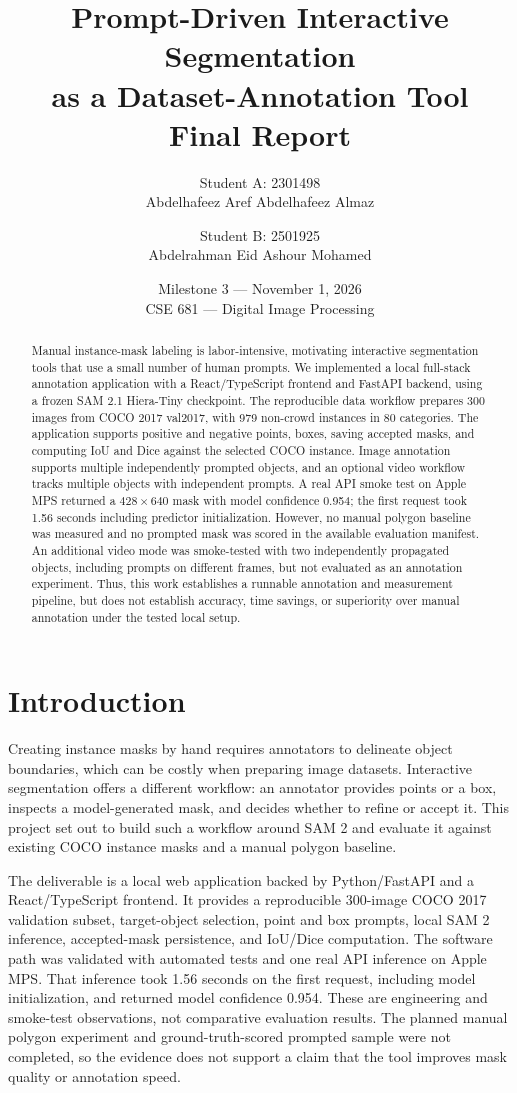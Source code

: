 \documentclass[11pt]{article}
\title{\LARGE Prompt-Driven Interactive Segmentation\\
\large as a Dataset-Annotation Tool\\[4pt]
\large Final Report}
\author{
  \begin{tabular}{c}
    Student A: 2301498\\
    Abdelhafeez Aref Abdelhafeez Almaz
  \end{tabular}
  \and
  \begin{tabular}{c}
    Student B: 2501925\\
    Abdelrahman Eid Ashour Mohamed
  \end{tabular}
}
\date{Milestone 3 --- November 1, 2026\\CSE 681 --- Digital Image Processing}
\begin{document}
\maketitle

\begin{abstract}
Manual instance-mask labeling is labor-intensive, motivating interactive
segmentation tools that use a small number of human prompts. We implemented a
local full-stack annotation application with a React/TypeScript frontend and
FastAPI backend, using a frozen SAM 2.1 Hiera-Tiny checkpoint. The reproducible
data workflow prepares 300 images from COCO 2017 val2017, with 979 non-crowd
instances in 80 categories. The application supports positive and negative
points, boxes, saving accepted masks, and computing IoU and Dice against the
selected COCO instance. Image annotation supports multiple independently
prompted objects, and an optional video workflow tracks multiple objects with
independent prompts. A real API smoke test on Apple MPS returned a
$428\times640$ mask with model confidence 0.954; the first request took
1.56 seconds including predictor initialization. However, no manual polygon
baseline was measured and no prompted mask was scored in the available
evaluation manifest. An additional video mode was smoke-tested with two
independently propagated objects, including prompts on different frames, but
not evaluated as an annotation experiment. Thus, this work
establishes a runnable annotation and measurement pipeline, but does not
establish accuracy, time savings, or superiority over manual annotation under
the tested local setup.
\end{abstract}

\section{Introduction}
\label{sec:intro}
Creating instance masks by hand requires annotators to delineate object
boundaries, which can be costly when preparing image datasets. Interactive
segmentation offers a different workflow: an annotator provides points or a
box, inspects a model-generated mask, and decides whether to refine or accept
it. This project set out to build such a workflow around SAM 2 and evaluate it
against existing COCO instance masks and a manual polygon baseline.

The deliverable is a local web application backed by Python/FastAPI and a
React/TypeScript frontend. It provides a reproducible 300-image COCO 2017
validation subset, target-object selection, point and box prompts, local SAM 2
inference, accepted-mask persistence, and IoU/Dice computation. The software
path was validated with automated tests and one real API inference on Apple
MPS. That inference took 1.56 seconds on the first request, including model
initialization, and returned model confidence 0.954. These are engineering and
smoke-test observations, not comparative evaluation results. The planned
manual polygon experiment and ground-truth-scored prompted sample were not
completed, so the evidence does not support a claim that the tool improves
mask quality or annotation speed.
\end{document}
